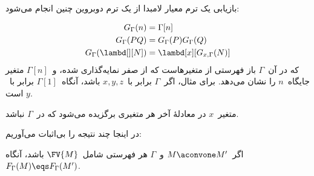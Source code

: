 \documentclass[../../../include/open-logic-section]{subfiles}
\begin{document}
بازیابی یک ترم معیار لامبدا از یک ترم دوبروین چنین انجام می‌شود:

\begin{defn}
  \begin{align*}
    G_\Gamma(n) &= \Gamma[n] \\
    G_\Gamma(PQ) &= G_\Gamma(P) G_\Gamma(Q) \\
    G_\Gamma(\lambd[][N]) &= \lambd[x][G_{x,\Gamma}(N)]
  \end{align*}
  که در آن~$\Gamma$ باز فهرستی از متغیرهاست که از صفر نمایه‌گذاری شده،
  و~$\Gamma[n]$ متغیر جایگاه~$n$ را نشان می‌دهد. برای مثال، اگر~$\Gamma$
  برابر با~$x,y,z$ باشد، آنگاه~$\Gamma[1]$ برابر با~$y$ است.

  متغیر~$x$ در معادلهٔ آخر هر متغیری برگزیده می‌شود که در~$\Gamma$
  نباشد.
\end{defn}

در اینجا چند نتیجه را بی‌اثبات می‌آوریم:

\begin{prop}
  اگر~$M \aconvone M'$ و~$\Gamma$ هر فهرستی شامل~$\FV{M}$ باشد، آنگاه
  $F_\Gamma(M) \eqs F_\Gamma(M')$.
\end{prop}
\end{document}
